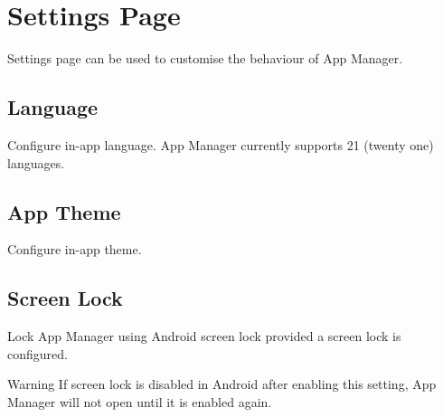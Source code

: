 \section{Settings Page}\label{sec:settings-page} %
Settings page can be used to customise the behaviour of App Manager.

\subsection{Language}\label{subsec:language} %
Configure in-app language. App Manager currently supports 21 (twenty one) languages.

\subsection{App Theme}\label{subsec:app-theme} %
Configure in-app theme.

\subsection{Screen Lock}\label{subsec:screen-lock} %
Lock App Manager using Android screen lock provided a screen lock is configured.

\begin{warning}{Warning}
    If screen lock is disabled in Android after enabling this setting, App Manager will not open until it is enabled again.
\end{warning}

